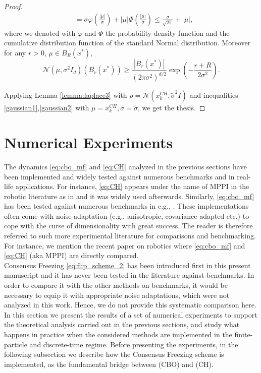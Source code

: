 \documentclass[reqno]{amsart}
\numberwithin{algorithm}{section}
\begin{document}
{\begin{proof}
\begin{equation}
\begin{aligned}
        &= \sigma \varphi\left(\frac{|\mu|}{\sigma}\right)+ |\mu| \Phi\left(\frac{|\mu|}{\sigma}\right) \leq \frac{\sigma}{\sqrt{2\pi}}+|\mu|,
    \end{aligned}
\end{equation}
where we denoted with $\varphi$ and $\Phi$ the probability density function and the cumulative distribution function of the standard Normal distribution. 
Moreover for any $r>0$, $\mu\in B_R(x^*)$, 
\begin{equation}\label{gaussian2}
    \mathcal N\left(\mu, \sigma^2 I_d\right)(B_r(x^*))\geq \frac{|B_r(x^*)|}{(2\pi\sigma^2)^{d/2}}\exp\left(-\frac{r+R}{2\sigma^2}\right). 
\end{equation}

Applying Lemma \ref{lemma:laplace3} with $\rho = \mathcal N(x_k^{CH}, \tilde\sigma^2 I)$ and inequalities \eqref{gaussian1},\eqref{gaussian2} with $\mu = x_k^{CH}, \sigma = \tilde{\sigma}$, we get the thesis.
\end{proof}

\section{Numerical Experiments}

The dynamics \eqref{eq:cbo_mf}  and \eqref{eq:CH}  analyzed in the previous sections have been implemented and widely tested against numerous benchmarks and in real-life applications. For instance, \eqref{eq:CH} appears under the name of MPPI in the robotic literature as in \cite{MPPI} and it was widely used afterwards. Similarly, \eqref{eq:cbo_mf} has been tested against numerous benchmarks in e.g., \cite{B1-borghi2021constrained,BORGHI2023113859,pinnau2017consensus, totzeck2020consensus}.
These implementations often come with noise adaptation (e.g., anisotropic, covariance adapted etc.) to cope with the curse of dimensionality with great success. The reader is therefore referred to such more experimental literature for comparisons and benchmarking. For instance, we mention the recent paper on robotics \cite{sun2026CBOrob} where \eqref{eq:cbo_mf} and \eqref{eq:CH} (aka MPPI) are directly compared.\\
Consensus Freezing \eqref{eq:flip_scheme_2} has been introduced first in this present manuscript and it has never been tested in the literature against benchmarks. In order to compare it with the other methods on benchmarks, it would be necessary to equip it with appropriate noise adaptations, which were not analyzed in this work. Hence, we do not provide this systematic comparison here. \\
In this section we present the results of a set of numerical experiments to support the theoretical analysis carried out in the previous sections, and study what happens in practice when the considered methods are implemented in the finite-particle and discrete-time regime. Before presenting the experiments, in the following subsection we describe how the Consensus Freezing scheme is implemented, as the fundamental bridge between (CBO) and (CH). 
}
\end{document}
